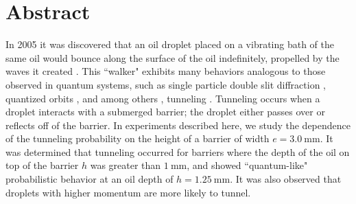     \chapter*{Abstract}
	In 2005 it was discovered that an oil droplet placed on a vibrating bath of the same oil would bounce along the surface of the oil indefinitely, propelled by the waves it created . This ``walker" exhibits many behaviors analogous to those observed in quantum systems, such as single particle double slit diffraction , quantized orbits , and among others , tunneling . Tunneling occurs when a droplet interacts with a submerged barrier; the droplet either passes over or reflects off of the barrier. In experiments described here, we study the dependence of the tunneling probability on the height of a barrier of width $e=3.0~\mathrm{mm}$. It was determined that tunneling occurred for barriers where the depth of the oil on top of the barrier $h$ was greater than $1~\mathrm{mm}$, and showed ``quantum-like" probabilistic behavior at an oil depth of $h=1.25~\mathrm{mm}$. It was also observed that droplets with higher momentum are more likely to tunnel. 